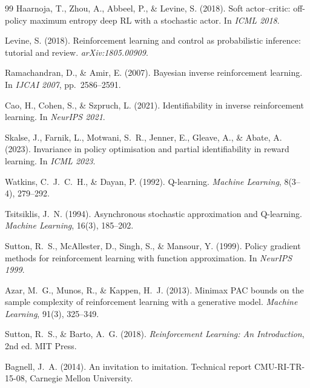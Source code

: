 \documentclass[11pt]{article}
\theoremstyle{plain}
\theoremstyle{definition}
\theoremstyle{remark}
\begin{document}
\begin{thebibliography}{99}
Haarnoja, T., Zhou, A., Abbeel, P., \& Levine, S. (2018). Soft
actor--critic: off-policy maximum entropy deep RL with a stochastic actor.
In \emph{ICML 2018}.

Levine, S. (2018). Reinforcement learning and control as probabilistic
inference: tutorial and review. \emph{arXiv:1805.00909}.

Ramachandran, D., \& Amir, E. (2007). Bayesian inverse reinforcement
learning. In \emph{IJCAI 2007}, pp.~2586--2591.

Cao, H., Cohen, S., \& Szpruch, L. (2021). Identifiability in inverse
reinforcement learning. In \emph{NeurIPS 2021}.

Skalse, J., Farnik, L., Motwani, S.~R., Jenner, E., Gleave, A., \& Abate,
A. (2023). Invariance in policy optimisation and partial identifiability
in reward learning. In \emph{ICML 2023}.

Watkins, C.~J.~C.~H., \& Dayan, P. (1992). Q-learning. \emph{Machine
Learning}, 8(3--4), 279--292.

Tsitsiklis, J.~N. (1994). Asynchronous stochastic approximation and
Q-learning. \emph{Machine Learning}, 16(3), 185--202.

Sutton, R.~S., McAllester, D., Singh, S., \& Mansour, Y. (1999). Policy
gradient methods for reinforcement learning with function approximation.
In \emph{NeurIPS 1999}.

Azar, M.~G., Munos, R., \& Kappen, H.~J. (2013). Minimax PAC bounds on the
sample complexity of reinforcement learning with a generative model.
\emph{Machine Learning}, 91(3), 325--349.

Sutton, R.~S., \& Barto, A.~G. (2018). \emph{Reinforcement Learning: An
Introduction}, 2nd ed. MIT Press.

Bagnell, J.~A. (2014). An invitation to imitation. Technical report
CMU-RI-TR-15-08, Carnegie Mellon University.

\end{thebibliography}
\end{document}
